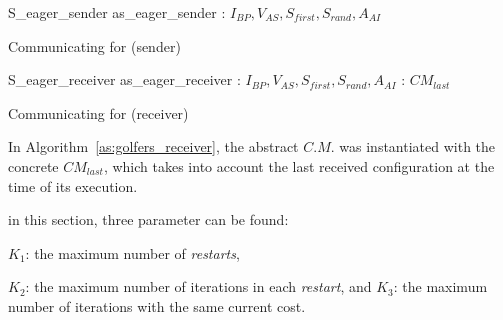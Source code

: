 \begin{algorithm}
\dontprintsemicolon
\SetNoline
{}
 S\_eager\_sender  as\_eager\_sender\;
\algoindent {} : $I_{BP}, V_{AS}, S_{first}, S_{rand}, A_{AI}$ \;
\caption{Communicating \as{} for \SGP{} (sender)}\label{as:golfers_sender}
\end{algorithm}

\begin{algorithm}
\dontprintsemicolon
\SetNoline
{}
 S\_eager\_receiver  as\_eager\_receiver\;
\algoindent {} : $I_{BP}, V_{AS}, S_{first}, S_{rand}, A_{AI}$ \;
\algoindent {} : $CM_{last}$
\caption{Communicating \as{} for \SGP{} (receiver)}\label{as:golfers_receiver}
\end{algorithm}

In Algorithm~\ref{as:golfers_receiver}, the abstract \opch{} $C.M.$ was instantiated with the concrete \opch{} $CM_{last}$, which takes into account the last received configuration at the time of its execution.

 in this section, three parameter can be found:\begin{inparaenum}[1.] \item $K_1$: the maximum number of {\it restarts}, \item $K_2$: the maximum number of iterations in each \textit{restart}, and $K_3$: the maximum number of iterations with the same current cost. \item \end{inparaenum}

